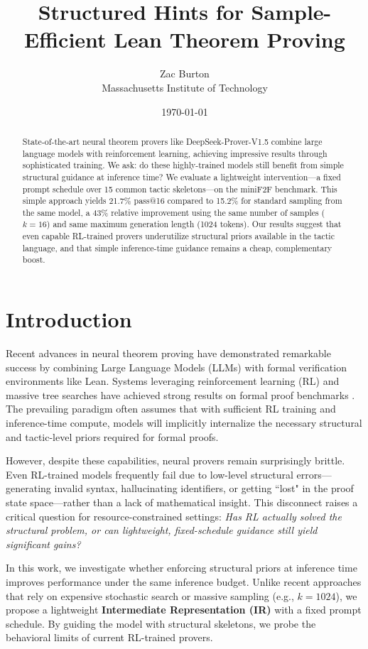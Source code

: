 \documentclass{article}
\title{Structured Hints for Sample-Efficient Lean Theorem Proving}
\author{Zac Burton \\ Massachusetts Institute of Technology}
\date{\today}
\begin{document}
\maketitle

\begin{abstract}
State-of-the-art neural theorem provers like DeepSeek-Prover-V1.5 combine large language models with reinforcement learning, achieving impressive results through sophisticated training. We ask: do these highly-trained models still benefit from simple structural guidance at inference time? We evaluate a lightweight intervention---a fixed prompt schedule over 15 common tactic skeletons---on the miniF2F benchmark. This simple approach yields 21.7\% pass@16 compared to 15.2\% for standard sampling from the same model, a 43\% relative improvement using the same number of samples ($k=16$) and same maximum generation length (1024 tokens). Our results suggest that even capable RL-trained provers underutilize structural priors available in the tactic language, and that simple inference-time guidance remains a cheap, complementary boost.
\end{abstract}

\section{Introduction}

Recent advances in neural theorem proving have demonstrated remarkable success by combining Large Language Models (LLMs) with formal verification environments like Lean. Systems leveraging reinforcement learning (RL) and massive tree searches have achieved strong results on formal proof benchmarks \cite{xin2024deepseek, chen2025seed, trinh2024solving}. The prevailing paradigm often assumes that with sufficient RL training and inference-time compute, models will implicitly internalize the necessary structural and tactic-level priors required for formal proofs.

However, despite these capabilities, neural provers remain surprisingly brittle. Even RL-trained models frequently fail due to low-level structural errors—generating invalid syntax, hallucinating identifiers, or getting ``lost" in the proof state space—rather than a lack of mathematical insight. This disconnect raises a critical question for resource-constrained settings: \textit{Has RL actually solved the structural problem, or can lightweight, fixed-schedule guidance still yield significant gains?}

In this work, we investigate whether enforcing structural priors at inference time improves performance under the same inference budget. Unlike recent approaches that rely on expensive stochastic search or massive sampling (e.g., $k=1024$), we propose a lightweight \textbf{Intermediate Representation (IR)} with a fixed prompt schedule. By guiding the model with structural skeletons, we probe the behavioral limits of current RL-trained provers.
\end{document}
